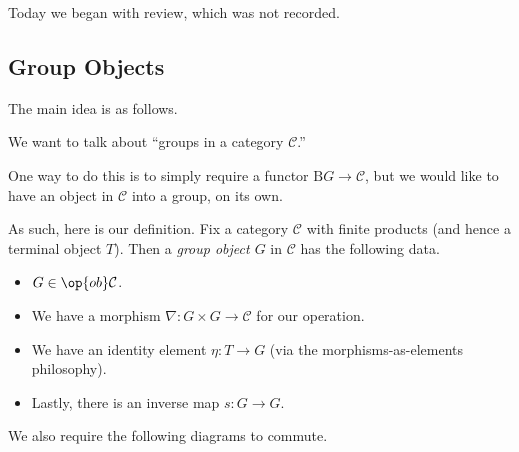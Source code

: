 \documentclass[../notes.tex]{subfiles}
\begin{document}

Today we began with review, which was not recorded.

\subsection{Group Objects}
The main idea is as follows.
\begin{idea}
	We want to talk about ``groups in a category $\mathcal C$.''
\end{idea}
One way to do this is to simply require a functor $\mathrm BG\to\mathcal C$, but we would like to have an object in $\mathcal C$ into a group, on its own.

As such, here is our definition. Fix a category $\mathcal C$ with finite products (and hence a terminal object $T$). Then a \textit{group object $G$} in $\mathcal C$ has the following data.
\begin{itemize}
	\item $G\in\op{ob}\mathcal C$.
	\item We have a morphism $\nabla:G\times G\to\mathcal C$ for our operation.
	\item We have an identity element $\eta:T\to G$ (via the morphisms-as-elements philosophy).
	\item Lastly, there is an inverse map $s:G\to G$.
\end{itemize}
We also require the following diagrams to commute.
\end{document}
